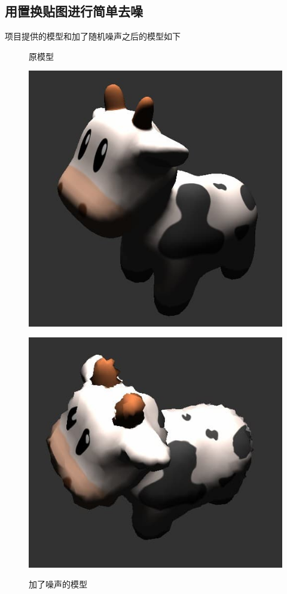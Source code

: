 \documentclass{article}
\begin{document}
	\subsection{用置换贴图进行简单去噪}
	项目提供的模型和加了随机噪声之后的模型如下
	\begin{figure}[htbp]
		\centering
		\begin{minipage}{0.49\linewidth}
			\centering
			\caption{原模型}
			\includegraphics[width=1\linewidth]{spot.jpg}
			\label{chutian1}%
		\end{minipage}
		\begin{minipage}{0.49\linewidth}
			\centering
			\caption{加了噪声的模型}
			\includegraphics[width=1\linewidth]{spot_noise.jpg}
			\label{chutian2}%
		\end{minipage}
	\end{figure}
\end{document}
